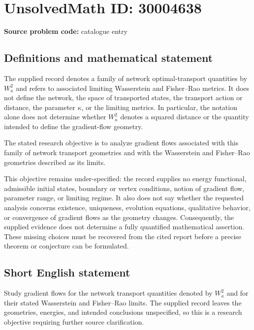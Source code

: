 \documentclass[11pt]{article}
\begin{document}
\section*{UnsolvedMath ID: 30004638}
\textbf{Source problem code:} catalogue entry
\subsection{Definitions and mathematical statement}
The supplied record denotes a family of network optimal-transport quantities by \(W_\kappa^2\) and refers to associated limiting Wasserstein and Fisher--Rao metrics. It does not define the network, the space of transported states, the transport action or distance, the parameter \(\kappa\), or the limiting metrics. In particular, the notation alone does not determine whether \(W_\kappa^2\) denotes a squared distance or the quantity intended to define the gradient-flow geometry.

The stated research objective is to analyze gradient flows associated with this family of network transport geometries and with the Wasserstein and Fisher--Rao geometries described as its limits.

This objective remains under-specified: the record supplies no energy functional, admissible initial states, boundary or vertex conditions, notion of gradient flow, parameter range, or limiting regime. It also does not say whether the requested analysis concerns existence, uniqueness, evolution equations, qualitative behavior, or convergence of gradient flows as the geometry changes. Consequently, the supplied evidence does not determine a fully quantified mathematical assertion. These missing choices must be recovered from the cited report before a precise theorem or conjecture can be formulated.
\subsection{Short English statement}
Study gradient flows for the network transport quantities denoted by \(W_\kappa^2\) and for their stated Wasserstein and Fisher--Rao limits. The supplied record leaves the geometries, energies, and intended conclusions unspecified, so this is a research objective requiring further source clarification.
\end{document}
